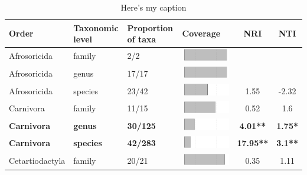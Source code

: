 \begin{longtable}{lL{1.8cm}C{2cm}lcc}
\caption{Here's my caption} \\ 
  \hline
Order & Taxonomic level & Proportion of taxa & Coverage & NRI & NTI \\ 
  \hline
Afrosoricida & family & 2/2 & \includegraphics[width=0.20\linewidth, height=0.05\linewidth]{Table_figures/bar1.pdf} &   &   \\ 
  Afrosoricida & genus & 17/17 & \includegraphics[width=0.20\linewidth, height=0.05\linewidth]{Table_figures/bar2.pdf} &   &   \\ 
  Afrosoricida & species & 23/42 & \includegraphics[width=0.20\linewidth, height=0.05\linewidth]{Table_figures/bar3.pdf} & 1.55 & -2.32 \\ 
  Carnivora & family & 11/15 & \includegraphics[width=0.20\linewidth, height=0.05\linewidth]{Table_figures/bar4.pdf} & 0.52 & 1.6 \\ 
  \textbf{Carnivora} & \textbf{genus} & \textbf{30/125} & \includegraphics[width=0.20\linewidth, height=0.05\linewidth]{Table_figures/bar5.pdf} & \textbf{4.01**} & \textbf{1.75*} \\ 
  \textbf{Carnivora} & \textbf{species} & \textbf{42/283} & \includegraphics[width=0.20\linewidth, height=0.05\linewidth]{Table_figures/bar6.pdf} & \textbf{17.95**} & \textbf{3.1**} \\ 
  Cetartiodactyla & family & 20/21 & \includegraphics[width=0.20\linewidth, height=0.05\linewidth]{Table_figures/bar7.pdf} & 0.35 & 1.11 \\ 

\end{longtable}
